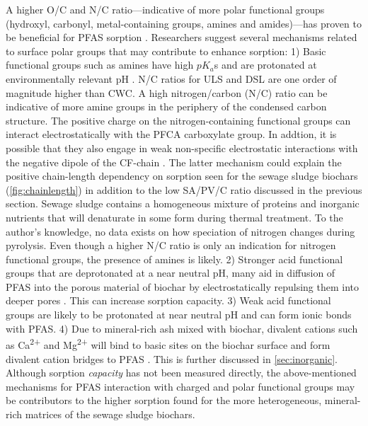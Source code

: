 A higher O/C and N/C ratio---indicative of more polar functional groups (hydroxyl, carbonyl, metal-containing groups, amines and amides)---has proven to be beneficial for PFAS sorption \citep{du2014adsorption}. Researchers suggest several mechanisms related to surface polar groups that may contribute to enhance sorption: 1) Basic functional groups such as amines have high $pK_a$s and are protonated at environmentally relevant pH \citep{deng2010removal}. N/C ratios for ULS and DSL are one order of magnitude higher than CWC. A high nitrogen/carbon (N/C) ratio can be indicative of more amine groups in the periphery of the condensed carbon structure. The positive charge on the nitrogen-containing functional groups can interact electrostatically with the PFCA carboxylate group. In addtion, it is possible that they also engage in weak non-specific electrostatic interactions with the negative dipole of the CF-chain \citep{xiao2011effects}. The latter mechanism could explain the positive chain-length dependency on sorption seen for the sewage sludge biochars (\cref{fig:chainlength}) in addition to the low SA/PV/C ratio discussed in the previous section. Sewage sludge contains a homogeneous mixture of proteins and inorganic nutrients that will denaturate in some form during thermal treatment. To the author's knowledge, no data exists on how speciation of nitrogen changes during pyrolysis. Even though a higher N/C ratio is only an indication for nitrogen functional groups, the presence of amines is likely. 2) Stronger acid functional groups that are deprotonated at a near neutral pH, many aid in diffusion of PFAS into the porous material of biochar by electrostatically repulsing them into deeper pores \citep{du2014adsorption}. This can increase sorption capacity. 3) Weak acid functional groups are likely to be protonated at near neutral pH and can form ionic bonds with PFAS. 4) Due to mineral-rich ash mixed with biochar, divalent cations such as Ca\textsuperscript{2+} and Mg\textsuperscript{2+} will bind to basic sites on the biochar surface and form divalent cation bridges to PFAS \citep{higgins2006sorption}. This is further discussed in \cref{sec:inorganic}. Although sorption \textit{capacity} has not been measured directly, the above-mentioned mechanisms for PFAS interaction with charged and polar functional groups may be contributors to the higher sorption found for the more heterogeneous, mineral-rich matrices of the sewage sludge biochars. 

